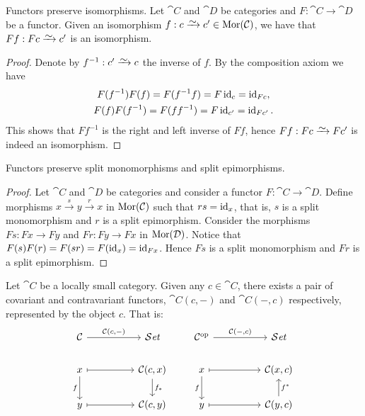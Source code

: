 \begin{lemma}\label{lem: functor preserve iso}
  Functors preserve isomorphisms. Let \(\cat C\) and \(\cat D\) be categories
  and \(F: \cat C \to \cat D\) be a functor. Given an isomorphism \(f: c \isoto
  c' \in \Mor(\cat C)\), we have that \(F f : F c \isoto c'\) is an isomorphism.
\end{lemma}

\begin{proof}
  Denote by \(f^{-1}: c' \isoto c\) the inverse of \(f\). By the composition
  axiom we have
  \begin{gather*}
    F (f^{-1}) F (f) = F (f^{-1} f) = F \operatorname{id}_c    = \operatorname{id}_{F c}, \\
    F (f) F (f^{-1}) = F (f f^{-1}) = F \operatorname{id}_{c'} = \operatorname{id}_{F c'}.
  \end{gather*}
  This shows that \(F f^{-1}\) is the right and left inverse of \(F f\), hence
  \(F f: F c \isoto F c'\) is indeed an isomorphism.
\end{proof}

\begin{lemma}\label{lem: func-preserve-split}
  Functors preserve split monomorphisms and split epimorphisms.
\end{lemma}

\begin{proof}
  Let \(\cat C\) and \(\cat D\) be categories and consider a functor \(F: \cat C
  \to \cat D\). Define morphisms \(x \xrightarrow s y \xrightarrow r x\) in
  \(\operatorname{Mor}(\mathcal C)\) such that \(r s = \operatorname{id}_x\), that is, \(s\) is a split
  monomorphism and \(r\) is a split epimorphism. Consider the morphisms \(F s: F
  x \to F y\) and \(F r: F y \to F x\) in \(\operatorname{Mor}(\mathcal D)\). Notice that \(F (s)
  F(r) = F(s r) = F(\operatorname{id}_x) = \operatorname{id}_{F x}\). Hence \(F s\) is a split monomorphism
and \(F r\) is a split epimorphism.
\end{proof}

\begin{definition}
  Let \(\cat C\) be a locally small category. Given any \(c \in \cat C\), there
  exists a pair of covariant and contravariant functors, \(\cat C(c, -)\) and
  \(\cat C(-, c)\) respectively, represented by the object \(c\). That is:
  \[
    \begin{tikzcd}
      \cat C \ar[rr, "\cat C{(c, -)}"] & & \Set
      \\
      x \ar[rr, maps to] \ar[d, swap, "f"]
      & & \cat C(c, x) \ar[d, "f_*"]
      \\
      y \ar[rr, maps to] & & \cat C(c, y)
    \end{tikzcd}
    \qquad
    \begin{tikzcd}
      \cat C^\op \ar[rr, "\cat C{(-, c)}"] & & \Set
      \\
      x \ar[rr, maps to] \ar[d, swap, "f"]
      & & \cat C(x, c)
      \\
      y \ar[rr, maps to] & & \cat C(y, c) \ar[u, swap, "f^*"]
    \end{tikzcd}
  \]
\end{definition}

